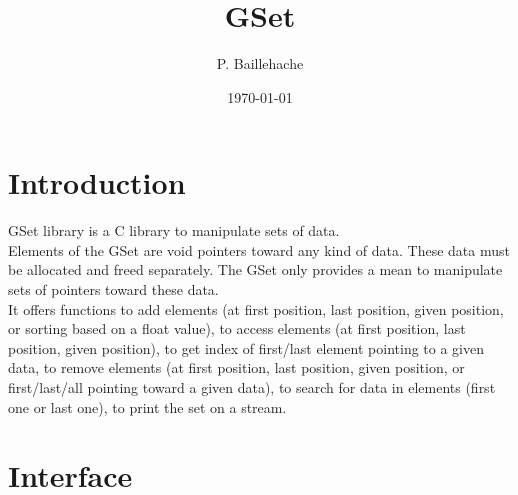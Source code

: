 \documentclass[12pt, a4paper]{article}
\begin{document}
\title{GSet}
\author{P. Baillehache}
\date{\today}
\maketitle

\tableofcontents

\section*{Introduction}

GSet library is a C library to manipulate sets of data.\\

Elements of the GSet are void pointers toward any kind of data. These data must be allocated and freed separately. The GSet only provides a mean to manipulate sets of pointers toward these data.\\

It offers functions to add elements (at first position, last position, given position, or sorting based on a float value), to access elements (at first position, last position, given position), to get index of first/last element pointing to a given data, to remove elements (at first position, last position, given position, or first/last/all pointing toward a given data), to search for data in elements (first one or last one), to print the set on a stream.\\ 

\section{Interface}
\end{document}
